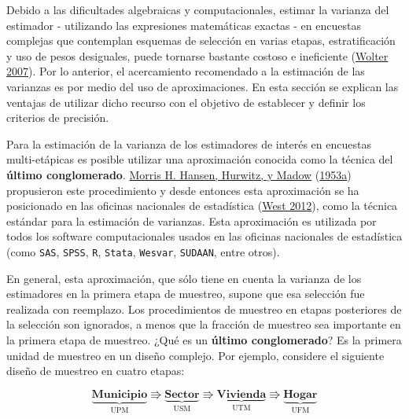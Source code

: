 \documentclass[
  12pt,
  spanish,
]{book}
\begin{document}
Debido a las dificultades algebraicas y computacionales, estimar la varianza del estimador - utilizando las expresiones matemáticas exactas - en encuestas complejas que contemplan esquemas de selección en varias etapas, estratificación y uso de pesos desiguales, puede tornarse bastante costoso e ineficiente (\protect\hyperlink{ref-Wolter_2007}{Wolter 2007}). Por lo anterior, el acercamiento recomendado a la estimación de las varianzas es por medio del uso de aproximaciones. En esta sección se explican las ventajas de utilizar dicho recurso con el objetivo de establecer y definir los criterios de precisión.

Para la estimación de la varianza de los estimadores de interés en encuestas multi-etápicas es posible utilizar una aproximación conocida como la técnica del \textbf{último conglomerado}. \protect\hyperlink{ref-Hansen_Hurwitz_Madow_1953}{Morris H. Hansen, Hurwitz, y Madow} (\protect\hyperlink{ref-Hansen_Hurwitz_Madow_1953}{1953a}) propusieron este procedimiento y desde entonces esta aproximación se ha posicionado en las oficinas nacionales de estadística (\protect\hyperlink{ref-West2012AccountingFM}{West 2012}), como la técnica estándar para la estimación de varianzas. Esta aproximación es utilizada por todos los software computacionales usados en las oficinas nacionales de estadística (como \texttt{SAS}, \texttt{SPSS}, \texttt{R}, \texttt{Stata}, \texttt{Wesvar}, \texttt{SUDAAN}, entre otros).

En general, esta aproximación, que sólo tiene en cuenta la varianza de los estimadores en la primera etapa de muestreo, supone que esa selección fue realizada con reemplazo. Los procedimientos de muestreo en etapas posteriores de la selección son ignorados, a menos que la fracción de muestreo sea importante en la primera etapa de muestreo. ¿Qué es un \textbf{último conglomerado}? Es la primera unidad de muestreo en un diseño complejo. Por ejemplo, considere el siguiente diseño de muestreo en cuatro etapas:

\begin{equation*}
\underbrace{\textbf{Municipio}}_{\text{UPM}} \Rrightarrow
\underbrace{\textbf{Sector}}_{\text{USM}} \Rrightarrow
\underbrace{\textbf{Vivienda}}_{\text{UTM}} \Rrightarrow
\underbrace{\textbf{Hogar}}_{\text{UFM}}
\end{equation*}
\end{document}
